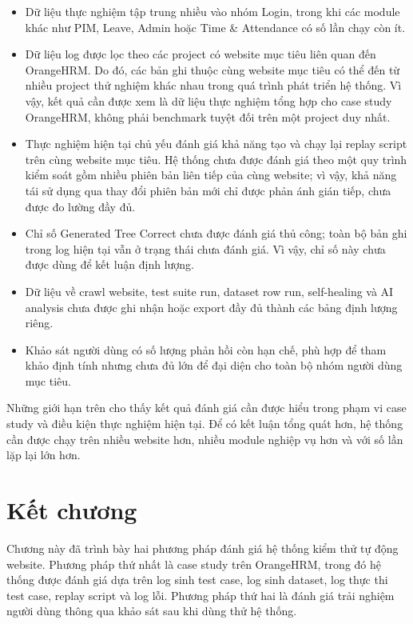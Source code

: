 \begin{itemize}
    \item Dữ liệu thực nghiệm tập trung nhiều vào nhóm Login, trong khi các module khác như PIM, Leave, Admin hoặc Time \& Attendance có số lần chạy còn ít.
    \item Dữ liệu log được lọc theo các project có website mục tiêu liên quan đến OrangeHRM. Do đó, các bản ghi thuộc cùng website mục tiêu có thể đến từ nhiều project thử nghiệm khác nhau trong quá trình phát triển hệ thống. Vì vậy, kết quả cần được xem là dữ liệu thực nghiệm tổng hợp cho case study OrangeHRM, không phải benchmark tuyệt đối trên một project duy nhất.
    \item Thực nghiệm hiện tại chủ yếu đánh giá khả năng tạo và chạy lại replay script trên cùng website mục tiêu. Hệ thống chưa được đánh giá theo một quy trình kiểm soát gồm nhiều phiên bản liên tiếp của cùng website; vì vậy, khả năng tái sử dụng qua thay đổi phiên bản mới chỉ được phản ánh gián tiếp, chưa được đo lường đầy đủ.
    \item Chỉ số Generated Tree Correct chưa được đánh giá thủ công; toàn bộ bản ghi trong log hiện tại vẫn ở trạng thái chưa đánh giá. Vì vậy, chỉ số này chưa được dùng để kết luận định lượng.
    \item Dữ liệu về crawl website, test suite run, dataset row run, self-healing và AI analysis chưa được ghi nhận hoặc export đầy đủ thành các bảng định lượng riêng.
    \item Khảo sát người dùng có số lượng phản hồi còn hạn chế, phù hợp để tham khảo định tính nhưng chưa đủ lớn để đại diện cho toàn bộ nhóm người dùng mục tiêu.
\end{itemize}

Những giới hạn trên cho thấy kết quả đánh giá cần được hiểu trong phạm vi case study và điều kiện thực nghiệm hiện tại. Để có kết luận tổng quát hơn, hệ thống cần được chạy trên nhiều website hơn, nhiều module nghiệp vụ hơn và với số lần lặp lại lớn hơn.

\section{Kết chương}

Chương này đã trình bày hai phương pháp đánh giá hệ thống kiểm thử tự động website. Phương pháp thứ nhất là case study trên OrangeHRM, trong đó hệ thống được đánh giá dựa trên log sinh test case, log sinh dataset, log thực thi test case, replay script và log lỗi. Phương pháp thứ hai là đánh giá trải nghiệm người dùng thông qua khảo sát sau khi dùng thử hệ thống.

